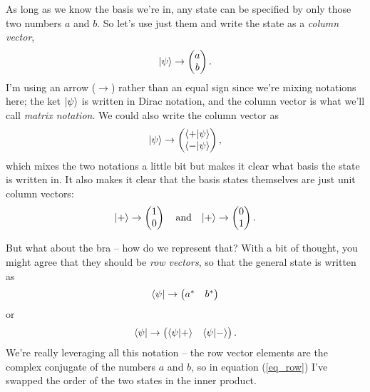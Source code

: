 As long as we know the basis we're in, any state can be specified by only those two numbers $a$ and $b$.  So let's use just them and write the state as a \emph{column vector},
\begin{equation}
| \psi \rangle \to \begin{pmatrix} a \\ b \end{pmatrix}.
\end{equation}
I'm using an arrow ($\to$) rather than an equal sign since we're mixing notations here; the ket $| \psi \rangle$ is written in Dirac notation, and the column vector is what we'll call \emph{matrix notation}.  We could also write the column vector as
\begin{equation}
| \psi \rangle \to \begin{pmatrix} \langle + | \psi \rangle \\ \langle - | \psi \rangle \end{pmatrix},
\end{equation}
which mixes the two notations a little bit but makes it clear what basis the state is written in.  It also makes it clear that the basis states themselves are just unit column vectors:
\begin{equation}
| + \rangle \to \begin{pmatrix} 1 \\ 0 \end{pmatrix} \quad \text{and} \quad | + \rangle \to \begin{pmatrix} 0 \\ 1 \end{pmatrix}.
\end{equation}

But what about the bra -- how do we represent that?  With a bit of thought, you might agree that they should be \emph{row vectors}, so that the general state is written as
\begin{equation}
\langle \psi | \to \begin{pmatrix} a^* & b^* \end{pmatrix}
\end{equation}
or 
\begin{equation}
\label{eq_row}
\langle \psi | \to \begin{pmatrix} \langle \psi | + \rangle & \langle \psi | - \rangle \end{pmatrix}.
\end{equation}
We're really leveraging all this notation -- the row vector elements are the complex conjugate of the numbers $a$ and $b$, so in equation (\ref{eq_row}) I've swapped the order of the two states in the inner product.

